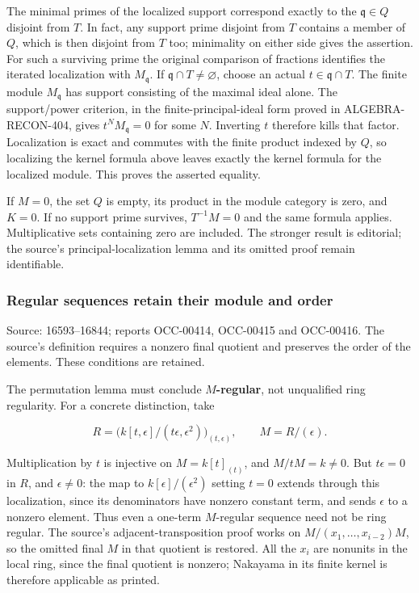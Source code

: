 The minimal primes of the localized support correspond exactly to the \(\mathfrak q\in Q\) disjoint from \(T\). In fact, any support prime disjoint from \(T\) contains a member of \(Q\), which is then disjoint from \(T\) too; minimality on either side gives the assertion. For such a surviving prime the original comparison of fractions identifies the iterated localization with \(M_{\mathfrak q}\). If \(\mathfrak q\cap T\ne\varnothing\), choose an actual \(t\in\mathfrak q\cap T\). The finite module \(M_{\mathfrak q}\) has support consisting of the maximal ideal alone. The support/power criterion, in the finite-principal-ideal form proved in ALGEBRA-RECON-404, gives \(t^N M_{\mathfrak q}=0\) for some \(N\). Inverting \(t\) therefore kills that factor. Localization is exact and commutes with the finite product indexed by \(Q\), so localizing the kernel formula above leaves exactly the kernel formula for the localized module. This proves the asserted equality.

If \(M=0\), the set \(Q\) is empty, its product in the module category is zero, and \(K=0\). If no support prime survives, \(T^{-1}M=0\) and the same formula applies. Multiplicative sets containing zero are included. The stronger result is editorial; the source's principal-localization lemma and its omitted proof remain identifiable.

\subsubsection{Regular sequences retain their module and order}\label{regular-sequences-retain-their-module-and-order}

Source: 16593--16844; reports OCC-00414, OCC-00415 and OCC-00416. The source's definition requires a nonzero final quotient and preserves the order of the elements. These conditions are retained.

The permutation lemma must conclude \textbf{\(M\)-regular}, not unqualified ring regularity. For a concrete distinction, take

\[
R=\bigl(k[t,\epsilon]/(t\epsilon,\epsilon^2)\bigr)_{(t,\epsilon)},
\qquad M=R/(\epsilon).
\]

Multiplication by \(t\) is injective on \(M=k[t]_{(t)}\), and \(M/tM=k\ne0\). But \(t\epsilon=0\) in \(R\), and \(\epsilon\ne0\): the map to \(k[\epsilon]/(\epsilon^2)\) setting \(t=0\) extends through this localization, since its denominators have nonzero constant term, and sends \(\epsilon\) to a nonzero element. Thus even a one-term \(M\)-regular sequence need not be ring regular. The source's adjacent-transposition proof works on \(M/(x_1,\ldots,x_{i-2})M\), so the omitted final \(M\) in that quotient is restored. All the \(x_i\) are nonunits in the local ring, since the final quotient is nonzero; Nakayama in its finite kernel is therefore applicable as printed.

